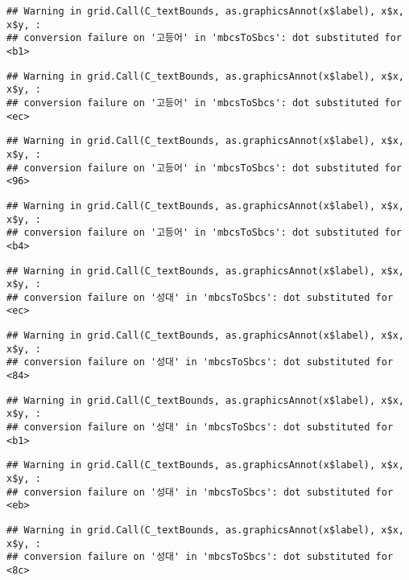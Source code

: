 \documentclass[
]{article}
\begin{document}
\begin{verbatim}
## Warning in grid.Call(C_textBounds, as.graphicsAnnot(x$label), x$x, x$y, :
## conversion failure on '고등어' in 'mbcsToSbcs': dot substituted for <b1>
\end{verbatim}

\begin{verbatim}
## Warning in grid.Call(C_textBounds, as.graphicsAnnot(x$label), x$x, x$y, :
## conversion failure on '고등어' in 'mbcsToSbcs': dot substituted for <ec>
\end{verbatim}

\begin{verbatim}
## Warning in grid.Call(C_textBounds, as.graphicsAnnot(x$label), x$x, x$y, :
## conversion failure on '고등어' in 'mbcsToSbcs': dot substituted for <96>
\end{verbatim}

\begin{verbatim}
## Warning in grid.Call(C_textBounds, as.graphicsAnnot(x$label), x$x, x$y, :
## conversion failure on '고등어' in 'mbcsToSbcs': dot substituted for <b4>
\end{verbatim}

\begin{verbatim}
## Warning in grid.Call(C_textBounds, as.graphicsAnnot(x$label), x$x, x$y, :
## conversion failure on '성대' in 'mbcsToSbcs': dot substituted for <ec>
\end{verbatim}

\begin{verbatim}
## Warning in grid.Call(C_textBounds, as.graphicsAnnot(x$label), x$x, x$y, :
## conversion failure on '성대' in 'mbcsToSbcs': dot substituted for <84>
\end{verbatim}

\begin{verbatim}
## Warning in grid.Call(C_textBounds, as.graphicsAnnot(x$label), x$x, x$y, :
## conversion failure on '성대' in 'mbcsToSbcs': dot substituted for <b1>
\end{verbatim}

\begin{verbatim}
## Warning in grid.Call(C_textBounds, as.graphicsAnnot(x$label), x$x, x$y, :
## conversion failure on '성대' in 'mbcsToSbcs': dot substituted for <eb>
\end{verbatim}

\begin{verbatim}
## Warning in grid.Call(C_textBounds, as.graphicsAnnot(x$label), x$x, x$y, :
## conversion failure on '성대' in 'mbcsToSbcs': dot substituted for <8c>
\end{verbatim}
\end{document}
